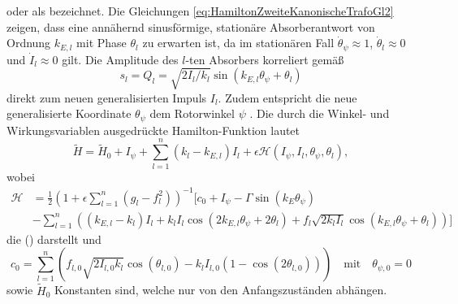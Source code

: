 oder als  \cite{London:1927:WinkelvarUkanTrafo} bezeichnet.
Die Gleichungen \eqref{eq:HamiltonZweiteKanonischeTrafoGl2} zeigen, 
dass eine annähernd sinusförmige, stationäre Absorberantwort von Ordnung $k_{E,l}$ mit Phase $\theta_l$
zu erwarten ist, da im stationären Fall $\dot{\theta}_{\psi} \approx 1$, $\dot{\theta}_l \approx 0$ und $\dot{I}_l \approx 0$ gilt.
Die Amplitude des $l$-ten Absorbers korreliert gemäß
\begin{equation}
		s_l = Q_l = \sqrt{2 {I_l}/{k_l} } \sin (k_{E,l} \theta_{\psi} + \theta_l)
	\label{eq:HamiltonAmplitudeSzuWinkelvariablen}
\end{equation}
direkt zum neuen generalisierten Impuls $I_l$. Zudem entspricht die neue generalisierte Koordinate $\theta_{\psi}$ dem Rotorwinkel $\psi$ \cite{Mayet:Tautochronic}.
Die durch die Winkel- und Wirkungsvariablen ausgedrückte Hamilton-Funktion lautet 
%
%
%
\begin{equation}
		\tilde{H} = \tilde{H}_0 + I_{\psi} + \sum_{l=1}^n \left(k_l - k_{E,l} \right) I_l + \epsilon \mathcal{H}(I_{\psi},I_l,\theta_{\psi},\theta_l),
	\label{eq:HamiltonfunktionNachTrafos}
\end{equation}
wobei 
%
%
\begin{equation}
	\begin{split}
		\mathcal{H} &= \frac{1}{2} \left( 1 + \epsilon \sum_{l=1}^n \left( g_l - f_l^2 \right) \right)^{-1}  \Bigg[  c_0 + I_{\psi} - \Gamma \sin(k_E \theta_{\psi}) \\
								&- \sum_{l=1}^n \left( \left(k_{E,l} - k_l\right) I_l + k_l I_l \cos(2 k_{E,l} \theta_{\psi} + 2 \theta_l) + f_l \sqrt{2k_l I_l} \cos(k_{E,l} \theta_{\psi} + \theta_l) \right) \Bigg]
	\end{split}
	\label{eq:HamiltonfunktionNachTrafosStoerterm}
\end{equation}
die  () darstellt  und
\begin{equation}
		c_0 =  \sum_{l=1}^n \left( f_{l,0} \sqrt{2 I_{l,0} k_l} \cos (\theta_{l,0})  - k_l I_{l,0} \left( 1 - \cos(2\theta_{l,0}) \right) \right) 
		\quad \text{mit} \quad 
		\theta_{\psi,0} = 0
	\label{eq:HamiltonfunktionNachTrafosKonstantec0}
\end{equation}
sowie $\tilde{H}_0$ Konstanten sind, welche nur von den Anfangszuständen abhängen.






























